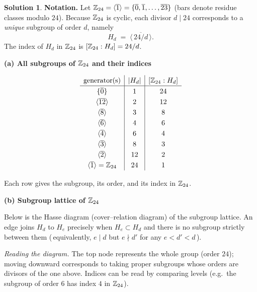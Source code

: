 \documentclass[12pt]{article}
\theoremstyle{definition} %
\newtheorem{solution}{Solution}
\theoremstyle{plain} %
\begin{document}
    \begin{solution}
      \textbf{Notation.}  
      Let $\Bbb Z_{24}=\langle\overline{1}\rangle=\{\overline{0},\overline{1},
      \ldots,\overline{23}\}$ (bars denote residue classes modulo $24$).
      Because $\Bbb Z_{24}$ is cyclic, each divisor $d\mid24$ corresponds to
      a \emph{unique} subgroup of order $d$, namely
      \[
              H_{d}\;=\;\bigl\langle\,\overline{24/d}\,\bigr\rangle.
      \]
      The index of $H_{d}$ in $\Bbb Z_{24}$ is $[\Bbb Z_{24}:H_{d}]=24/d$.
      
      \bigskip
      \noindent
      \textbf{(a)  All subgroups of $\Bbb Z_{24}$ and their indices}
      
      \[
      \renewcommand{\arraystretch}{1.25}
      \begin{array}{c|c|c}
      \text{generator(s)} & |H_{d}| & [\Bbb Z_{24}:H_{d}]\\\hline
      \{\overline{0}\} & 1 & 24\\
      \langle\overline{12}\rangle & 2 & 12\\
      \langle\overline{8}\rangle  & 3 & 8\\
      \langle\overline{6}\rangle  & 4 & 6\\
      \langle\overline{4}\rangle  & 6 & 4\\
      \langle\overline{3}\rangle  & 8 & 3\\
      \langle\overline{2}\rangle  & 12 & 2\\
      \langle\overline{1}\rangle=\Bbb Z_{24} & 24 & 1
      \end{array}
      \]
      
      Each row gives the subgroup, its order, and its index in $\Bbb Z_{24}$.
      
      \bigskip
      \noindent
      \textbf{(b)  Subgroup lattice of $\Bbb Z_{24}$}
      
      Below is the Hasse diagram (cover–relation diagram) of the subgroup
      lattice.  An edge joins $H_{d}$ to $H_{e}$ precisely when
      $H_{e}\subset H_{d}$ and there is no subgroup strictly between them
      (\,equivalently, $e\mid d$ but $e\!\nmid d'$ for any $e<d'<d$\,).
      
      

      \emph{Reading the diagram.}  
      The top node represents the whole group (order $24$);
      moving downward corresponds to taking proper subgroups whose orders are
      divisors of the one above.  
      Indices can be read by comparing levels  
      (e.g.\ the subgroup of order $6$ has index $4$ in $\Bbb Z_{24}$).
      \end{solution}
\end{document}
